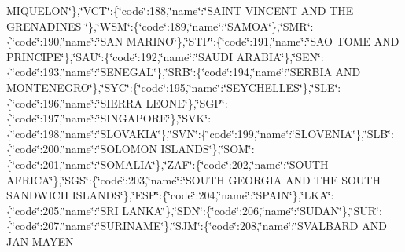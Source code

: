 {M\-I\-Q\-U\-E\-L\-O\-N\char`\"{}\},\char`\"{}V\-C\-T\char`\"{}\-:\{\char`\"{}code\char`\"{}\-:188,\char`\"{}name\char`\"{}\-:\char`\"{}S\-A\-I\-N\-T V\-I\-N\-C\-E\-N\-T A\-N\-D T\-H\-E G\-R\-E\-N\-A\-D\-I\-N\-E\-S \char`\"{}\},\char`\"{}W\-S\-M\char`\"{}\-:\{\char`\"{}code\char`\"{}\-:189,\char`\"{}name\char`\"{}\-:\char`\"{}S\-A\-M\-O\-A\char`\"{}\},\char`\"{}S\-M\-R\char`\"{}\-:\{\char`\"{}code\char`\"{}\-:190,\char`\"{}name\char`\"{}\-:\char`\"{}S\-A\-N M\-A\-R\-I\-N\-O\char`\"{}\},\char`\"{}S\-T\-P\char`\"{}\-:\{\char`\"{}code\char`\"{}\-:191,\char`\"{}name\char`\"{}\-:\char`\"{}S\-A\-O T\-O\-M\-E A\-N\-D P\-R\-I\-N\-C\-I\-P\-E\char`\"{}\},\char`\"{}S\-A\-U\char`\"{}\-:\{\char`\"{}code\char`\"{}\-:192,\char`\"{}name\char`\"{}\-:\char`\"{}S\-A\-U\-D\-I A\-R\-A\-B\-I\-A\char`\"{}\},\char`\"{}S\-E\-N\char`\"{}\-:\{\char`\"{}code\char`\"{}\-:193,\char`\"{}name\char`\"{}\-:\char`\"{}S\-E\-N\-E\-G\-A\-L\char`\"{}\},\char`\"{}S\-R\-B\char`\"{}\-:\{\char`\"{}code\char`\"{}\-:194,\char`\"{}name\char`\"{}\-:\char`\"{}S\-E\-R\-B\-I\-A A\-N\-D M\-O\-N\-T\-E\-N\-E\-G\-R\-O\char`\"{}\},\char`\"{}S\-Y\-C\char`\"{}\-:\{\char`\"{}code\char`\"{}\-:195,\char`\"{}name\char`\"{}\-:\char`\"{}S\-E\-Y\-C\-H\-E\-L\-L\-E\-S\char`\"{}\},\char`\"{}S\-L\-E\char`\"{}\-:\{\char`\"{}code\char`\"{}\-:196,\char`\"{}name\char`\"{}\-:\char`\"{}S\-I\-E\-R\-R\-A L\-E\-O\-N\-E\char`\"{}\},\char`\"{}S\-G\-P\char`\"{}\-:\{\char`\"{}code\char`\"{}\-:197,\char`\"{}name\char`\"{}\-:\char`\"{}S\-I\-N\-G\-A\-P\-O\-R\-E\char`\"{}\},\char`\"{}S\-V\-K\char`\"{}\-:\{\char`\"{}code\char`\"{}\-:198,\char`\"{}name\char`\"{}\-:\char`\"{}S\-L\-O\-V\-A\-K\-I\-A\char`\"{}\},\char`\"{}S\-V\-N\char`\"{}\-:\{\char`\"{}code\char`\"{}\-:199,\char`\"{}name\char`\"{}\-:\char`\"{}S\-L\-O\-V\-E\-N\-I\-A\char`\"{}\},\char`\"{}S\-L\-B\char`\"{}\-:\{\char`\"{}code\char`\"{}\-:200,\char`\"{}name\char`\"{}\-:\char`\"{}S\-O\-L\-O\-M\-O\-N I\-S\-L\-A\-N\-D\-S\char`\"{}\},\char`\"{}S\-O\-M\char`\"{}\-:\{\char`\"{}code\char`\"{}\-:201,\char`\"{}name\char`\"{}\-:\char`\"{}S\-O\-M\-A\-L\-I\-A\char`\"{}\},\char`\"{}Z\-A\-F\char`\"{}\-:\{\char`\"{}code\char`\"{}\-:202,\char`\"{}name\char`\"{}\-:\char`\"{}S\-O\-U\-T\-H A\-F\-R\-I\-C\-A\char`\"{}\},\char`\"{}S\-G\-S\char`\"{}\-:\{\char`\"{}code\char`\"{}\-:203,\char`\"{}name\char`\"{}\-:\char`\"{}S\-O\-U\-T\-H G\-E\-O\-R\-G\-I\-A A\-N\-D T\-H\-E S\-O\-U\-T\-H S\-A\-N\-D\-W\-I\-C\-H I\-S\-L\-A\-N\-D\-S\char`\"{}\},\char`\"{}E\-S\-P\char`\"{}\-:\{\char`\"{}code\char`\"{}\-:204,\char`\"{}name\char`\"{}\-:\char`\"{}S\-P\-A\-I\-N\char`\"{}\},\char`\"{}L\-K\-A\char`\"{}\-:\{\char`\"{}code\char`\"{}\-:205,\char`\"{}name\char`\"{}\-:\char`\"{}S\-R\-I L\-A\-N\-K\-A\char`\"{}\},\char`\"{}S\-D\-N\char`\"{}\-:\{\char`\"{}code\char`\"{}\-:206,\char`\"{}name\char`\"{}\-:\char`\"{}S\-U\-D\-A\-N\char`\"{}\},\char`\"{}S\-U\-R\char`\"{}\-:\{\char`\"{}code\char`\"{}\-:207,\char`\"{}name\char`\"{}\-:\char`\"{}S\-U\-R\-I\-N\-A\-M\-E\char`\"{}\},\char`\"{}S\-J\-M\char`\"{}\-:\{\char`\"{}code\char`\"{}\-:208,\char`\"{}name\char`\"{}\-:\char`\"{}S\-V\-A\-L\-B\-A\-R\-D A\-N\-D J\-A\-N M\-A\-Y\-E\-N }

